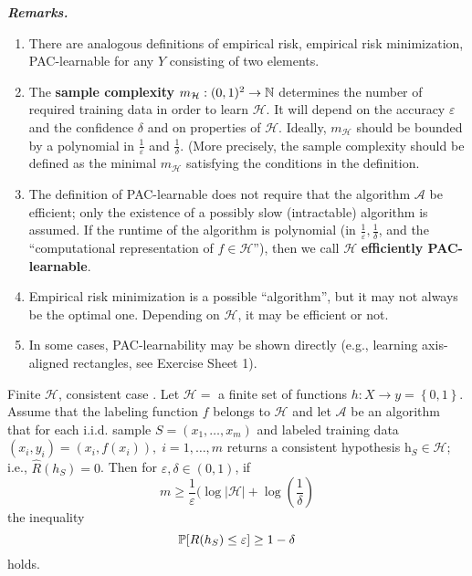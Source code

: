 \documentclass{article}
\begin{document}
\textbf{\textit{Remarks.}}

\begin{enumerate}
\item There are analogous definitions of empirical risk, empirical risk minimization, PAC-learnable for any $Y$ consisting of two elements.
\item The \textbf{sample complexity} $m_{\mathcal{H}} : (0, 1)^2 \rightarrow \mathbb{N}$ determines the number of required training data in order to learn $\mathcal{H}$. It will depend on the accuracy $\varepsilon$ and the confidence $\delta$ and on properties of $\mathcal{H}$. Ideally, $m_{\mathcal{H}}$ should be bounded by a polynomial in $\frac{1}{\varepsilon}$ and $\frac{1}{\delta}$. (More precisely, the sample complexity should be defined as the minimal $m_{\mathcal{H}}$ satisfying the conditions in the definition.
\item The definition of PAC-learnable does not require that the algorithm $\mathcal{A}$ be efficient; only the existence of a possibly slow (intractable) algorithm is assumed. If the runtime of the algorithm is polynomial (in $\frac{1}{\varepsilon}, \frac{1}{\delta}$, and the ``computational representation of $f \in \mathcal{H}$''), then we call $\mathcal{H}$ \textbf{efficiently PAC-learnable}.
\item Empirical risk minimization is a possible ``algorithm'', but it may not always be the optimal one. Depending on $\mathcal{H}$, it may be efficient or not.
\item In some cases, PAC-learnability may be shown directly (e.g., learning axis-aligned rectangles, see Exercise Sheet 1).
\end{enumerate}

\begin{Theorem}{Finite $\mathcal{H}$, consistent case}
.  Let $\mathcal{H} = $ a finite set of functions $h: X \rightarrow y = \left\{ 0, 1 \right\}$. Assume that the labeling function $f$ belongs to $\mathcal{H}$ and let $\mathcal{A}$ be an algorithm that for each i.i.d. sample $S = (x_1, \dots, x_m)$ and labeled training data $(x_i, y_i) = (x_i, f(x_i)), \; i = 1 , \dots, m$ returns a consistent hypothesis h$_S \in \mathcal{H}$; i.e., $\hat{R}(h_S) = 0$. Then for $\varepsilon, \delta \in (0, 1)$, if
\begin{equation}
  m \geq \frac{1}{\varepsilon} (\log |\mathcal{H}| + \log \left( \frac{1}{\delta} \right)
\end{equation}
the inequality
\begin{equation}
  \mathbb{P} [R(h_S) \leq \varepsilon] \geq 1 - \delta
\end{equation}
holds.
\end{Theorem}
\end{document}
